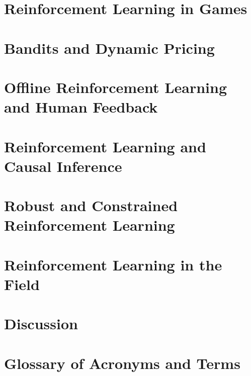 \documentclass[11pt,notitlepage,a4paper]{article}
\begin{document}
\section{Reinforcement Learning in Games}
\label{section:rl_games}


\section{Bandits and Dynamic Pricing}
\label{section:bandits}


\section{Offline Reinforcement Learning and Human Feedback}
\label{section:offline_rl}


\section{Reinforcement Learning and Causal Inference}
\label{section:causal_rl}


\section{Robust and Constrained Reinforcement Learning}
\label{section:dist_robust_constrained}


\section{Reinforcement Learning in the Field}
\label{section:field_deployments}


\section{Discussion}
\label{section:conclusion}






\appendix
\section{Glossary of Acronyms and Terms}
\label{appendix:glossary}

\end{document}
